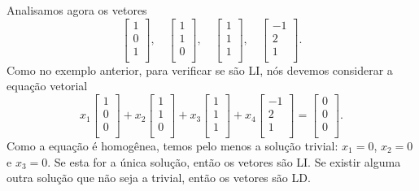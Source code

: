 \documentclass[../livro.tex]{subfiles}
\begin{document}
\begin{example}\label{exp:2}
Analisamos agora os vetores
\begin{equation}
\left[
  \begin{array}{c}
    1 \\
    0 \\
    1 \\
  \end{array}
\right], \quad
\left[
  \begin{array}{c}
    1 \\
    1 \\
    0 \\
  \end{array}
\right], \quad
\left[
  \begin{array}{c}
    1 \\
    1 \\
    1 \\
  \end{array}
\right], \quad
\left[
  \begin{array}{c}
    -1 \\
    2 \\
    1 \\
  \end{array}
\right].
\end{equation} Como no exemplo anterior, para verificar se são LI, nós devemos considerar a equação vetorial
\begin{equation}
x_1 \left[
  \begin{array}{c}
    1 \\
    0 \\
    0 \\
  \end{array}
\right] +
x_2\left[
  \begin{array}{c}
    1 \\
    1 \\
    0 \\
  \end{array}
\right] +
x_3\left[
  \begin{array}{c}
    1 \\
    1 \\
    1 \\
  \end{array}
\right]+
x_4\left[
  \begin{array}{c}
    -1 \\
    2 \\
    1 \\
  \end{array}
\right] =
\left[
  \begin{array}{c}
    0 \\
    0 \\
    0 \\
  \end{array}
\right].
\end{equation} Como a equação é homogênea, temos pelo menos a solução trivial: $x_1 = 0$, $x_2=0$ e $x_3 = 0$. Se esta for a única solução, então os vetores são LI. Se existir alguma outra solução que não seja a trivial, então os vetores são LD.


\end{example}
\end{document}
